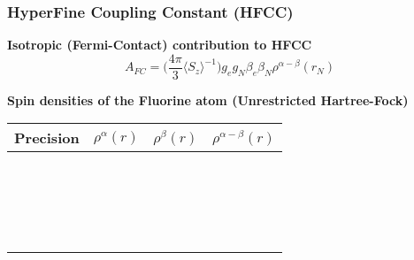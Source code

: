 \begin{frame}
\frametitle{HyperFine Coupling Constant (HFCC)}
\centering
\scriptsize
\textbf{Isotropic (Fermi-Contact) contribution to HFCC}
\begin{equation}
    \nonumber
    A_{FC} = \Big(\frac{4\pi}{3}\langle S_z \rangle^{-1}\Big)
    g_eg_N\beta_e\beta_N\rho^{\alpha-\beta}(r_N)
\end{equation}
\begin{table}
\textbf{Spin densities of the Fluorine atom (Unrestricted Hartree-Fock)}
\begin{tabular}{crrr}
\hline
\hline
\multicolumn{1}{c}{\textbf{Precision}}&
\multicolumn{1}{c}{$\rho^\alpha(r)$}&
\multicolumn{1}{c}{$\rho^\beta(r)$}&
\multicolumn{1}{c}{$\rho^{\alpha-\beta}(r)$}\\
\hline                        
\hspace{10mm}\     & \hspace{18mm}\     & \hspace{18mm}\     & \hspace{15mm}\ \\
                   &                    &                    &                \\
                   &                    &                    &                \\
                   &                    &                    &                \\
                   &                    &                    &                \\
                   &                    &                    &                \\
                   &                    &                    &                \\
                   &                    &                    &                \\
                   &                    &                    &                \\
                   &                    &                    &                \\
                   &                    &                    &                \\
                   &                    &                    &                \\
                   &                    &                    &                \\
                   &                    &                    &                \\
                   &                    &                    &                \\
\hline
\hline
\end{tabular}
\end{table}
\end{frame}

